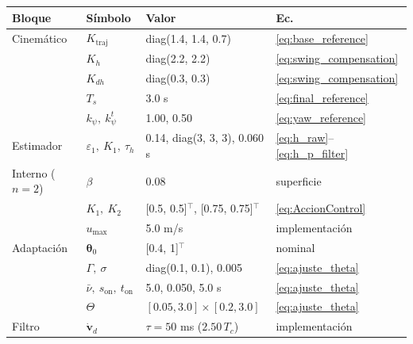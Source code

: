 \begin{tabular}{llll}
\toprule
Bloque & S\'imbolo & Valor & Ec. \\
\midrule
Cinem\'atico & $K_{\mathrm{traj}}$ & diag(1.4, 1.4, 0.7) & \eqref{eq:base_reference} \\
 & $K_h$ & diag(2.2, 2.2) & \eqref{eq:swing_compensation} \\
 & $K_{dh}$ & diag(0.3, 0.3) & \eqref{eq:swing_compensation} \\
 & $T_s$ & 3.0 s & \eqref{eq:final_reference} \\
 & $k_\psi,\ k_\psi^t$ & 1.00, 0.50 & \eqref{eq:yaw_reference} \\
Estimador & $\varepsilon_1,\ K_1,\ \tau_h$ & 0.14, diag(3, 3, 3), 0.060 s & \eqref{eq:h_raw}--\eqref{eq:h_p_filter} \\
Interno ($n=2$) & $\beta$ & 0.08 & superficie \\
 & $K_1,\ K_2$ & [0.5, 0.5]$^\top$, [0.75, 0.75]$^\top$ & \eqref{eq:AccionControl} \\
 & $u_{\max}$ & 5.0 m/s & implementaci\'on \\
Adaptaci\'on & $\boldsymbol{\theta}_0$ & [0.4, 1]$^\top$ & nominal \\
 & $\Gamma,\ \sigma$ & diag(0.1, 0.1), 0.005 & \eqref{eq:ajuste_theta} \\
 & $\bar\nu,\ s_{\mathrm{on}},\ t_{\mathrm{on}}$ & 5.0, 0.050, 5.0 s & \eqref{eq:ajuste_theta} \\
 & $\Theta$ & $[0.05,3.0]\times[0.2,3.0]$ & \eqref{eq:ajuste_theta} \\
Filtro & $\dot{\mathbf{v}}_d$ & $\tau = 50$ ms ($2.50\,T_c$) & implementaci\'on \\
\bottomrule
\end{tabular}
